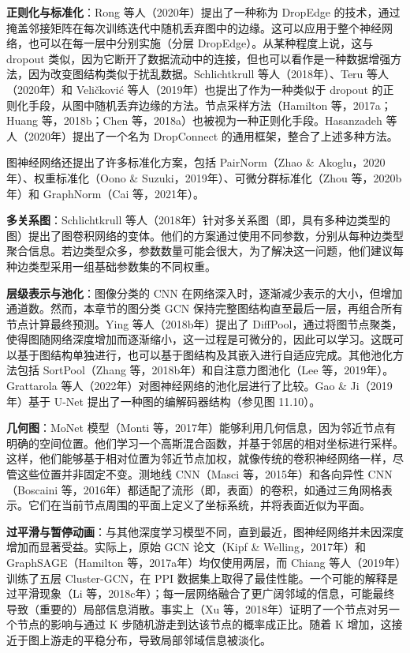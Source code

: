 \documentclass[lang=cn,newtx,10pt,scheme=chinese]{elegantbook}
\begin{document}
\textbf{正则化与标准化}：Rong 等人（2020年）提出了一种称为 DropEdge 的技术，通过掩盖邻接矩阵在每次训练迭代中随机丢弃图中的边缘。这可以应用于整个神经网络，也可以在每一层中分别实施（分层 DropEdge）。从某种程度上说，这与 dropout 类似，因为它断开了数据流动中的连接，但也可以看作是一种数据增强方法，因为改变图结构类似于扰乱数据。Schlichtkrull 等人（2018年）、Teru 等人（2020年）和 Veličković 等人（2019年）也提出了作为一种类似于 dropout 的正则化手段，从图中随机丢弃边缘的方法。节点采样方法（Hamilton 等，2017a；Huang 等，2018b；Chen 等，2018a）也被视为一种正则化手段。Hasanzadeh 等人（2020年）提出了一个名为 DropConnect 的通用框架，整合了上述多种方法。

图神经网络还提出了许多标准化方案，包括 PairNorm（Zhao \& Akoglu，2020年）、权重标准化（Oono \& Suzuki，2019年）、可微分群标准化（Zhou 等，2020b年）和 GraphNorm（Cai 等，2021年）。

\textbf{多关系图}：Schlichtkrull 等人（2018年）针对多关系图（即，具有多种边类型的图）提出了图卷积网络的变体。他们的方案通过使用不同参数，分别从每种边类型聚合信息。若边类型众多，参数数量可能会很大，为了解决这一问题，他们建议每种边类型采用一组基础参数集的不同权重。

\textbf{层级表示与池化}：图像分类的 CNN 在网络深入时，逐渐减少表示的大小，但增加通道数。然而，本章节的图分类 GCN 保持完整图结构直至最后一层，再组合所有节点计算最终预测。Ying 等人（2018b年）提出了 DiffPool，通过将图节点聚类，使得图随网络深度增加而逐渐缩小，这一过程是可微分的，因此可以学习。这既可以基于图结构单独进行，也可以基于图结构及其嵌入进行自适应完成。其他池化方法包括 SortPool（Zhang 等，2018b年）和自注意力图池化（Lee 等，2019年）。Grattarola 等人（2022年）对图神经网络的池化层进行了比较。Gao \& Ji（2019年）基于 U-Net 提出了一种图的编解码器结构（参见图 11.10）。

\textbf{几何图}：MoNet 模型（Monti 等，2017年）能够利用几何信息，因为邻近节点有明确的空间位置。他们学习一个高斯混合函数，并基于邻居的相对坐标进行采样。这样，他们能够基于相对位置为邻近节点加权，就像传统的卷积神经网络一样，尽管这些位置并非固定不变。测地线 CNN（Masci 等，2015年）和各向异性 CNN（Boscaini 等，2016年）都适配了流形（即，表面）的卷积，如通过三角网格表示。它们在当前节点周围的平面上定义了坐标系统，并将表面近似为平面。

\textbf{过平滑与暂停动画}：与其他深度学习模型不同，直到最近，图神经网络并未因深度增加而显著受益。实际上，原始 GCN 论文（Kipf \& Welling，2017年）和 GraphSAGE（Hamilton 等，2017a年）均仅使用两层，而 Chiang 等人（2019年）训练了五层 Cluster-GCN，在 PPI 数据集上取得了最佳性能。一个可能的解释是过平滑现象（Li 等，2018c年）；每一层网络融合了更广阔邻域的信息，可能最终导致（重要的）局部信息消散。事实上（Xu 等，2018年）证明了一个节点对另一个节点的影响与通过 K 步随机游走到达该节点的概率成正比。随着 K 增加，这接近于图上游走的平稳分布，导致局部邻域信息被淡化。
\end{document}
